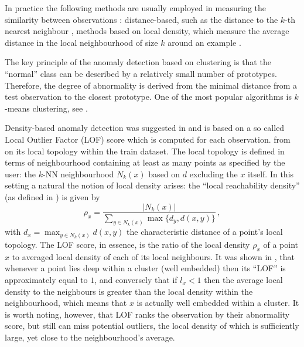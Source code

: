\documentclass[a4paper,14pt]{extarticle}
\begin{document}
In practice the following methods are usually employed in measuring the similarity
between observations \cite{duda2012}: distance-based, such as the distance to the
$k$-th nearest neighbour \cite{zhang2006}, methods based on local density, which
measure the average distance in the local neighbourhood of size $k$ around an example
\cite{hautamaki2004}.

The key principle of the anomaly detection based on clustering is that the ``normal''
class can be described by a relatively small number of prototypes. Therefore, the
degree of abnormality is derived from the minimal distance from a test observation
to the closest prototype.  One of the most popular algorithms is $k$-means clustering,
see \cite{srivastava2005,srivastava2006}.

Density-based anomaly detection was suggested in \cite{breunig2000} and is based
on a so called Local Outlier Factor (LOF) score which is computed for each observation.
from on its local topology within the train dataset. The local topology is defined
in terms of neighbourhood containing at least as many points as specified by the
user: the $k$-NN neighbourhood $N_k(x)$ based on $d$ excluding the $x$ itself. In
this setting a natural the notion of local density arises: the ``local reachability
density'' (as defined in \cite{breunig2000}) is given by
\begin{equation*}
    \rho_x = \frac{|N_k(x)|}{\sum_{y\in N_k(x)} \max\{d_y, d(x,y)\}} \,,
\end{equation*}
with $d_x = \max_{y\in N_k(x)} d(x, y)$ the characteristic distance of a point's
local topology. The LOF score, in essence, is the ratio of the local density $\rho_x$
of a point $x$ to averaged local density of each of its local neighbours. It was
shown in \cite{breunig2000}, that whenever a point lies deep within a cluster (well
embedded) then its ``LOF'' is approximately equal to $1$, and conversely that if
$l_x < 1$ then the average local density to the neighbours is greater than the
local density within the neighbourhood, which means that $x$ is actually well embedded
within a cluster. It is worth noting, however, that LOF ranks the observation by
their abnormality score, but still can miss potential outliers, the local density
of which is sufficiently large, yet close to the neighbourhood's average.
\end{document}
